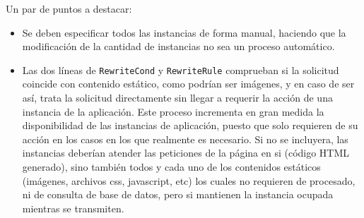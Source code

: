 %      
%      
%      
%
%      

Un par de puntos a destacar:

\begin{itemize}
  \item Se deben especificar todos las instancias de forma manual, haciendo que la modificación de la cantidad de instancias no sea un proceso automático.
  \item Las dos líneas de \texttt{RewriteCond} y \texttt{RewriteRule} comprueban si la solicitud coincide con contenido estático, como podrían ser imágenes, y en caso de ser así, trata la solicitud directamente sin llegar a requerir la acción de una instancia de la aplicación. Este proceso incrementa en gran medida la disponibilidad de las instancias de aplicación, puesto que solo requieren de su acción en los casos en los que realmente es necesario. Si no se incluyera, las instancias deberían atender las peticiones de la página en si (código HTML generado), sino también todos y cada uno de los contenidos estáticos (imágenes, archivos css, javascript, etc) los cuales no requieren de procesado, ni de consulta de base de datos, pero si mantienen la instancia ocupada mientras se transmiten.
\end{itemize}


